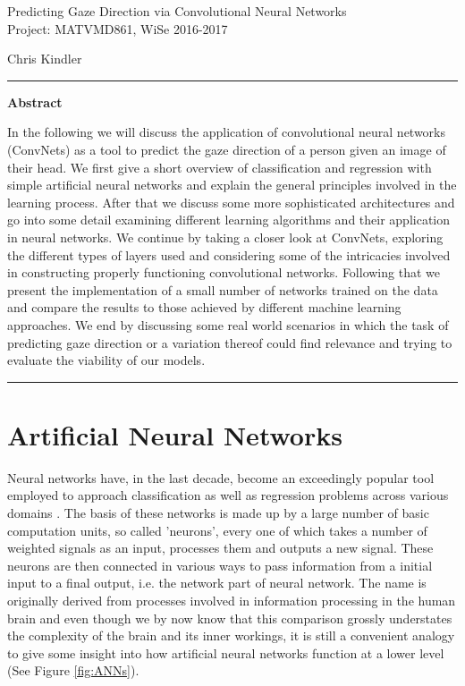 \documentclass[preprint,12pt,3p]{elsarticle}
\begin{document}


\centering

\Large Predicting Gaze Direction via Convolutional Neural Networks\\\large Project: MATVMD861, WiSe 2016-2017\\\bigskip\bigskip

\normalsize Chris Kindler
\\
\bigskip\bigskip\bigskip




\justify


\hrule
\bigskip
\textbf{Abstract}
\smallskip

\noindent
In the following we will discuss the application of convolutional neural networks (ConvNets) as a tool to predict the gaze direction of a person given an image of their head. We first give a short overview of classification and regression with simple artificial neural networks and explain the general principles involved in the learning process. After that we discuss some more sophisticated architectures and go into some detail examining different learning algorithms and their application in neural networks. We continue by taking a closer look at ConvNets, exploring the different types of layers used and considering some of the intricacies involved in constructing properly functioning convolutional networks. Following that we present the implementation of a small number of networks trained on the data and compare the results to those achieved by different machine learning approaches. We end by discussing some real world scenarios in which the task of predicting gaze direction or a variation thereof could find relevance and trying to evaluate the viability of our models.
\\
\medskip
\hrule
\bigskip
\bigskip
\bigskip


\section{Artificial Neural Networks}

Neural networks have, in the last decade, become an exceedingly popular tool employed to approach classification as well as regression problems across various domains \cite{goossens93}. The basis of these networks is made up by a large number of basic computation units, so called 'neurons', every one of which takes a number of weighted signals as an input, processes them and outputs a new signal. These neurons are then connected in various ways to pass information from a initial input to a final output, i.e. the network part of neural network. The name is originally derived from processes involved in information processing in the human brain and even though we by now know that this comparison grossly understates the complexity of the brain and its inner workings, it is still a convenient analogy to give some insight into how artificial neural networks function at a lower level (See Figure \ref{fig:ANNs}). 
\end{document}
